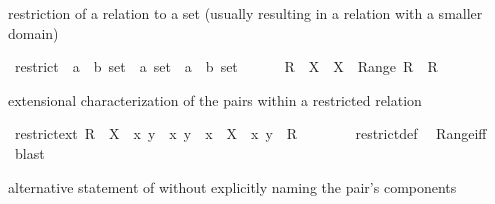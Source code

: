 \begin{isabellebody}
\isamarkuptrue%
%
\begin{isamarkuptext}%
restriction of a relation to a set (usually resulting in a relation with a smaller domain)%
\end{isamarkuptext}%
\isamarkuptrue%
\isamarkupfalse%
\ restrict\ {\isacharcolon}{\isacharcolon}\ {\isachardoublequoteopen}{\isacharparenleft}{\isacharprime}a\ {\isasymtimes}\ {\isacharprime}b{\isacharparenright}\ set\ {\isasymRightarrow}\ {\isacharprime}a\ set\ {\isasymRightarrow}\ {\isacharparenleft}{\isacharprime}a\ {\isasymtimes}\ {\isacharprime}b{\isacharparenright}\ set{\isachardoublequoteclose}\ {\isacharparenleft}\ {\isachardoublequoteopen}{\isacharbar}{\isacharbar}{\isachardoublequoteclose}\ {}{}{\isacharparenright}\isanewline
\ \ \ {\isachardoublequoteopen}R\ {\isacharbar}{\isacharbar}\ X\ {\isacharequal}\ {\isacharparenleft}X\ {\isasymtimes}\ Range\ R{\isacharparenright}\ {\isasyminter}\ R{\isachardoublequoteclose}%
\begin{isamarkuptext}%
extensional characterization of the pairs within a restricted relation%
\end{isamarkuptext}%
\isamarkuptrue%
\isamarkupfalse%
\ restrict{\isacharunderscore}ext{\isacharcolon}\ {\isachardoublequoteopen}R\ {\isacharbar}{\isacharbar}\ X\ {\isacharequal}\ {\isacharbraceleft}{\isacharparenleft}x{\isacharcomma}\ y{\isacharparenright}\ {\isacharbar}\ x\ y\ {\isachardot}\ x\ {\isasymin}\ X\ {\isasymand}\ {\isacharparenleft}x{\isacharcomma}\ y{\isacharparenright}\ {\isasymin}\ R{\isacharbraceright}{\isachardoublequoteclose}\isanewline
%
\isadelimproof
\ \ \ \ \ \ %
\endisadelimproof
%
\isatagproof
{}\isamarkupfalse%
\ restrict{\isacharunderscore}def\ \isamarkupfalse%
\ Range{\isacharunderscore}iff\ \isamarkupfalse%
\ blast%
\endisatagproof
{\isafoldproof}%
%
\isadelimproof
%
\endisadelimproof
%
\begin{isamarkuptext}%
alternative statement of  without explicitly naming the pair's components%
\end{isamarkuptext}%
\isamarkuptrue%

\end{isabellebody}
